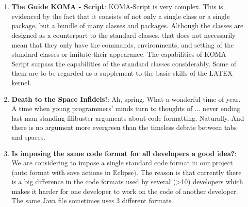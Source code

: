 

%
\cleardoublepage
{}


\chapter{}


\begin{englishtext}
\begin{enumerate}

    \item \textbf{The Guide KOMA - Script}: KOMA-Script  is very complex. This is
    evidenced by the fact that it consists of not only a single class or a
    single package, but a bundle of many classes and packages. Although the
    classes are designed as a counterpart to the standard classes, that does not
    necessarily mean that they only have the commands, environments, and setting
    of the standard classes or imitate their appearance. The capabilities of
    KOMA-Script surpass the capabilities of the standard classes considerably.
    Some of them are to be regarded as a supplement to the basic skills of the
    LATEX kernel. \cite{komaScrguien}

    \item \textbf{Death to the Space Infidels!}: Ah, spring. What a wonderful time of
    year. A time when young programmers' minds turn to thoughts of ... never
    ending last-man-standing filibuster arguments about code formatting.
    Naturally. And there is no argument more evergreen than the timeless debate
    between tabs and spaces. \cite{Atwood}

    \item \textbf{Is imposing the same code format for all developers a good idea?}: We
    are considering to impose a single standard code format in our project (auto
    format with save actions in Eclipse). The reason is that currently there is
    a big difference in the code formats used by several (>10) developers which
    makes it harder for one developer to work on the code of another developer.
    The same Java file sometimes uses 3 different formats. \cite{Geukens}


\end{enumerate}
\end{englishtext}
